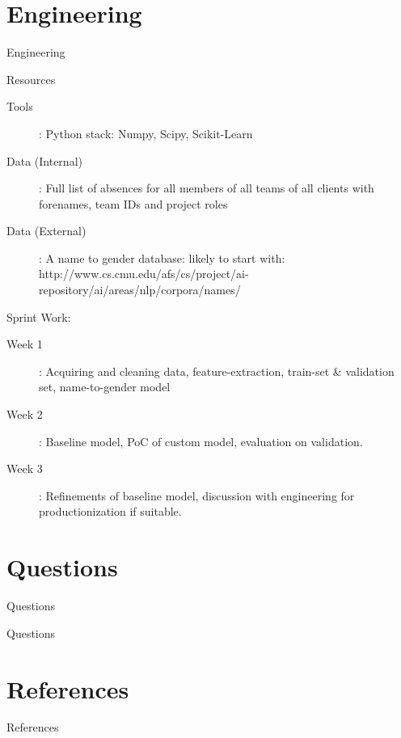\documentclass[xcolor=dvipsnames]{beamer}
\begin{document}
\section{Engineering}
\begin{frame}{Engineering}

Resources
\begin{description}
    \item[Tools]: Python stack: Numpy, Scipy, Scikit-Learn
    \item[Data (Internal)]: Full list of absences for all members of all teams of all clients with forenames, team IDs and project roles
    \item[Data (External)]: A name to gender database: likely to start with: {\small http://www.cs.cmu.edu/afs/cs/project/ai-repository/ai/areas/nlp/corpora/names/ }
\end{description}
Sprint Work:
\begin{description}
    \item[Week 1]: Acquiring and cleaning data, feature-extraction, train-set \& validation set, name-to-gender model
    \item[Week 2]: Baseline model, PoC of custom model, evaluation on validation.
    \item[Week 3]: Refinements of baseline model, discussion with engineering for productionization if suitable.
\end{description}



\end{frame}


\section{Questions}
\begin{frame}{Questions}

Questions



\end{frame}




\section{References}
\begin{frame}[allowframebreaks]{References}

{\tiny 
    
    
}

\end{frame}
\end{document}
